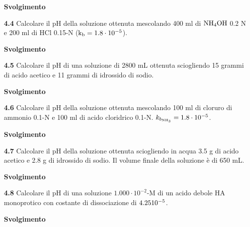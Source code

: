 \vspace{0.2cm}\large\textbf{Svolgimento}\normalsize

\vspace{0.2cm}

\vspace{0.2cm}\textbf{4.4} Calcolare il pH della soluzione ottenuta mescolando 400 ml di $\rm NH_4OH$ 0.2 N e 200 ml di HCl 0.15-N ($\rm k_b = 1.8 \cdot 10^{-5}$).

\vspace{0.2cm}\large\textbf{Svolgimento}\normalsize

\vspace{0.2cm}

\vspace{0.2cm}\textbf{4.5} Calcolare il pH di una soluzione di 2800 mL ottenuta sciogliendo 15 grammi di acido acetico e 11 grammi di idrossido di sodio.

\vspace{0.2cm}\large\textbf{Svolgimento}\normalsize

\vspace{0.2cm}

\vspace{0.2cm}\textbf{4.6} Calcolare il pH della soluzione ottenuta mescolando 100 ml di cloruro di ammonio 0.1-N e 100
ml di acido cloridrico 0.1-N. $k_{b_{\rm NH_3}}=1.8 \cdot 10^{-5}$.

\vspace{0.2cm}\large\textbf{Svolgimento}\normalsize

\vspace{0.2cm}

\vspace{0.2cm}\textbf{4.7} Calcolare il pH della soluzione ottenuta sciogliendo in acqua 3.5 g di acido acetico e 2.8 g di idrossido di sodio. Il volume finale della soluzione è di 650 mL.

\vspace{0.2cm}\large\textbf{Svolgimento}\normalsize

\vspace{0.2cm}

\vspace{0.2cm}\textbf{4.8} Calcolare il pH di una soluzione $1.000 \cdot 10^{-2}$-M di un acido debole HA monoprotico con costante di dissociazione di $4.25 \rm  10^{-5}$.

\vspace{0.2cm}\large\textbf{Svolgimento}\normalsize

\vspace{0.2cm}

